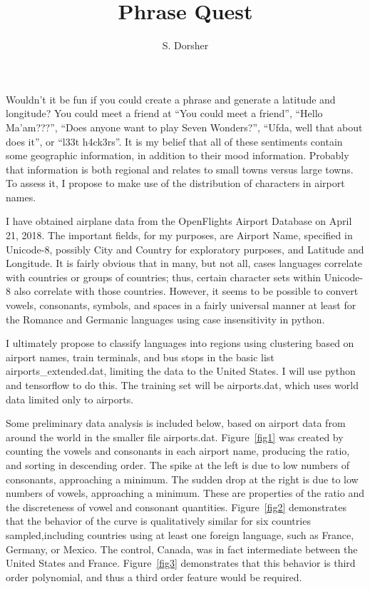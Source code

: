 \documentclass{article}
\begin{document}
\author{S. Dorsher}
\title{Phrase Quest}

\maketitle

Wouldn't it be fun if you could create a phrase and generate a
latitude and longitude? You could meet a friend at ``You could meet a
friend'', ``Hello Ma'am???'', ``Does anyone want to play Seven
Wonders?'', ``Ufda, well that about does it'', or ``l33t h4ck3rs''. It is my belief that all of these sentiments contain some geographic information, in addition to their mood information. Probably that information is both regional and relates to small towns versus large towns. To assess it, I propose to make use of the distribution of characters in airport names. 

I have obtained airplane data from the OpenFlights Airport Database on
April 21, 2018. The important fields, for my purposes, are Airport
Name, specified in Unicode-8, possibly City and Country for
exploratory purposes, and Latitude and Longitude. It is fairly obvious
that in many, but not all, cases languages correlate with countries or
groups of countries; thus, certain character sets within Unicode-8
also correlate with those countries. However, it seems to be possible
to convert vowels, consonants, symbols, and spaces in a fairly
universal manner at least for the Romance and Germanic languages using
case insensitivity in python.

I ultimately propose to classify languages into regions using
clustering based on airport names, train terminals, and bus stops in
the basic list airports\_extended.dat, limiting the data to the United
States. I will use python and tensorflow to do this. The training set
will be airports.dat, which uses world data limited only to airports.

Some preliminary data analysis is included below, based on airport
data from around the world in the smaller file
airports.dat. Figure~\ref{fig1} was created by counting the vowels and
consonants in each airport name, producing the ratio, and sorting in
descending order. The spike at the left is due to low numbers of
consonants, approaching a minimum. The sudden drop at the right is due
to low numbers of vowels, approaching a minimum. These are properties
of the ratio and the discreteness of vowel and consonant
quantities. Figure~\ref{fig2} demonstrates that the behavior of the
curve is qualitatively similar for six countries sampled,including
countries using at least one foreign language, such as France,
Germany, or Mexico. The control, Canada, was in fact intermediate
between the United States and France. Figure~\ref{fig3} demonstrates
that this behavior is third order polynomial, and thus a third order
feature would be required. 
\end{document}
